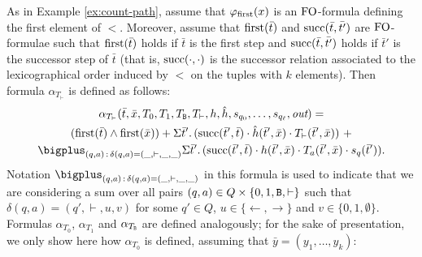 As in Example \ref{ex:count-path}, assume that $\varphi_{\text{\rm first}}(x)$ is an ${\rm FO}$-formula defining the first element of $<$. Moreover, assume that $\operatorname{first}(\bar t)$ and $\operatorname{succ}(\bar{t},\bar{t'})$ are ${\rm FO}$-formulae such that 
$\operatorname{first}(\bar t)$ holds if $\bar t$ is the first step and $\operatorname{succ}(\bar{t},\bar{t'})$ holds if $\bar t'$ is the successor step of $\bar t$ (that is, $\operatorname{succ}(\cdot,\cdot)$ is the successor relation associated to the lexicographical order induced by $<$ on the tuples with $k$ elements).  Then formula $\alpha_{T_{\vdash}}$ is defined as follows:
\begin{multline*}
\alpha_{T_{\vdash}}(\bar{t},\bar{x},T_0,T_1,T_{\ttB},T_{\vdash},h,\hat{h},s_{q_0},\ldots,s_{q_{\ell}},\out) = \\
(\first(\bar{t}) \wedge \first(\bar{x})) +
\sa{\bar{t}'}(\successor(\bar{t}',\bar{t}) \mult \hat{h}(\bar{t}',\bar{x}) \mult T_{\vdash}(\bar{t}',\bar{x})) \ + \\
\bigplus_{(q,a) \,:\, \delta(q,a) = (\_,\vdash,\_,\_)}\sa{\bar{t}'}(\successor(\bar{t}',\bar{t}) \mult h(\bar{t}',\bar{x}) \mult T_a(\bar{t}',\bar{x}) \mult s_{q}(\bar{t}')).
\end{multline*}
Notation $\bigplus_{(q,a) \,:\, \delta(q,a) = (\_,\vdash,\_,\_)}$ in this formula is used to indicate that we are considering a sum over all pairs $(q,a) \in Q \times \{0,1,\mathtt{B},\vdash\}$ such that $\delta(q,a) = (q',\vdash,u,v)$ for some $q' \in Q$, $u \in \{\leftarrow,\rightarrow\}$ and $v \in \{0,1,\emptyset\}$.
Formulas $\alpha_{T_0}$, $\alpha_{T_1}$ and $\alpha_{T_{\mathtt{B}}}$ are defined analogously; for the sake of presentation, we only show here how $\alpha_{T_0}$ is defined, assuming that $\bar y = (y_1, \ldots, y_k)$:
